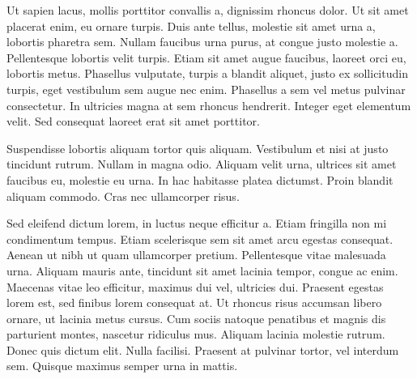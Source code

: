 Ut sapien lacus, mollis porttitor convallis a, dignissim rhoncus dolor. Ut sit amet placerat enim, eu ornare turpis. Duis ante tellus, molestie sit amet urna a, lobortis pharetra sem. Nullam faucibus urna purus, at congue justo molestie a. Pellentesque lobortis velit turpis. Etiam sit amet augue faucibus, laoreet orci eu, lobortis metus. Phasellus vulputate, turpis a blandit aliquet, justo ex sollicitudin turpis, eget vestibulum sem augue nec enim. Phasellus a sem vel metus pulvinar consectetur. In ultricies magna at sem rhoncus hendrerit. Integer eget elementum velit. Sed consequat laoreet erat sit amet porttitor.

Suspendisse lobortis aliquam tortor quis aliquam. Vestibulum et nisi at justo tincidunt rutrum. Nullam in magna odio. Aliquam velit urna, ultrices sit amet faucibus eu, molestie eu urna. In hac habitasse platea dictumst. Proin blandit aliquam commodo. Cras nec ullamcorper risus.

Sed eleifend dictum lorem, in luctus neque efficitur a. Etiam fringilla non mi condimentum tempus. Etiam scelerisque sem sit amet arcu egestas consequat. Aenean ut nibh ut quam ullamcorper pretium. Pellentesque vitae malesuada urna. Aliquam mauris ante, tincidunt sit amet lacinia tempor, congue ac enim. Maecenas vitae leo efficitur, maximus dui vel, ultricies dui. Praesent egestas lorem est, sed finibus lorem consequat at. Ut rhoncus risus accumsan libero ornare, ut lacinia metus cursus. Cum sociis natoque penatibus et magnis dis parturient montes, nascetur ridiculus mus. Aliquam lacinia molestie rutrum. Donec quis dictum elit. Nulla facilisi. Praesent at pulvinar tortor, vel interdum sem. Quisque maximus semper urna in mattis.
